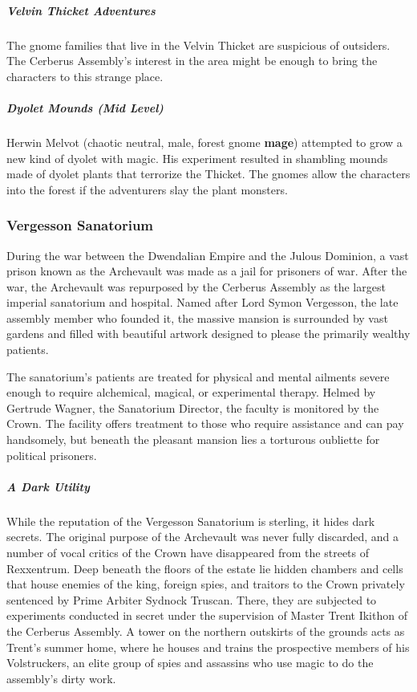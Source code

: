 \documentclass[10pt,a4paper,twoside,bg=print,twocolumn,openany,nodeprecatedcode]{dndbook}
\begin{document}
\subparagraph{Velvin Thicket Adventures}
The gnome families that live in the Velvin Thicket are suspicious of outsiders. The Cerberus Assembly's interest in the area might be enough to bring the characters to this strange place.

\subparagraph{Dyolet Mounds (Mid Level)}
Herwin Melvot (chaotic neutral, male, forest gnome \textbf{mage}) attempted to grow a new kind of dyolet with magic. His experiment resulted in shambling mounds made of dyolet plants that terrorize the Thicket. The gnomes allow the characters into the forest if the adventurers slay the plant monsters.

\subsubsection{Vergesson Sanatorium}
During the war between the Dwendalian Empire and the Julous Dominion, a vast prison known as the Archevault was made as a jail for prisoners of war. After the war, the Archevault was repurposed by the Cerberus Assembly as the largest imperial sanatorium and hospital. Named after Lord Symon Vergesson, the late assembly member who founded it, the massive mansion is surrounded by vast gardens and filled with beautiful artwork designed to please the primarily wealthy patients.

The sanatorium's patients are treated for physical and mental ailments severe enough to require alchemical, magical, or experimental therapy. Helmed by Gertrude Wagner, the Sanatorium Director, the faculty is monitored by the Crown. The facility offers treatment to those who require assistance and can pay handsomely, but beneath the pleasant mansion lies a torturous oubliette for political prisoners.

\subparagraph{A Dark Utility}
While the reputation of the Vergesson Sanatorium is sterling, it hides dark secrets. The original purpose of the Archevault was never fully discarded, and a number of vocal critics of the Crown have disappeared from the streets of Rexxentrum. Deep beneath the floors of the estate lie hidden chambers and cells that house enemies of the king, foreign spies, and traitors to the Crown privately sentenced by Prime Arbiter Sydnock Truscan. There, they are subjected to experiments conducted in secret under the supervision of Master Trent Ikithon of the Cerberus Assembly. A tower on the northern outskirts of the grounds acts as Trent's summer home, where he houses and trains the prospective members of his Volstruckers, an elite group of spies and assassins who use magic to do the assembly's dirty work.
\end{document}
